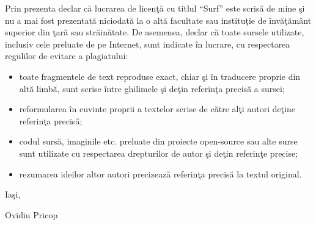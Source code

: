 Prin prezenta declar c\u{a} lucrarea de licen\c{t}\u{a} cu titlul  \enquote{Surf} este scris\u{a} de mine \c{s}i nu a mai fost prezentat\u{a} niciodat\u{a} la o alt\u{a} facultate sau institu\c{t}ie de \^{i}nv\u{a}\c{t}\u{a}m\^{a}nt superior din \c{t}ar\u{a} sau str\u{a}in\u{a}tate. De asemenea, declar c\u{a} toate sursele utilizate, inclusiv cele preluate de pe Internet, sunt indicate \^{i}n lucrare, cu respectarea regulilor de evitare a plagiatului:

\begin{itemize}
	
	\item {toate fragmentele de text reproduse exact, chiar \c{s}i \^{i}n traducere proprie din alt\u{a} limb\u{a}, sunt scrise \^{i}ntre ghilimele \c{s}i de\c{t}in referin\c{t}a precis\u{a} a sursei;}
	      
	\item {reformularea \^{i}n cuvinte proprii a textelor scrise de c\u{a}tre al\c{t}i autori de\c{t}ine referin\c{t}a precis\u{a};}
	      
	\item {codul surs\u{a}, imaginile etc. preluate din proiecte open-source sau alte surse sunt utilizate cu respectarea drepturilor de autor \c{s}i de\c{t}in referin\c{t}e precise;}
	      
	\item {rezumarea ideilor altor autori precizeaz\u{a} referin\c{t}a precis\u{a} la textul original.}
	
\end{itemize}

\begin{bottompar}
	\begin{flushleft}
		Ia\c{s}i, \GLOBALDATE
	\end{flushleft}

	\vspace{0.5cm}
	\begin{flushright}
		Ovidiu Pricop
	\end{flushright}
\end{bottompar}